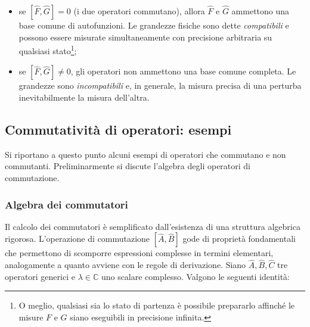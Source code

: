 \documentclass[a4paper,11pt]{report}
\begin{document}
\begin{itemize}
    \item se $[\hat{F}, \hat{G}] = 0$ (i due operatori commutano), allora $\hat{F}$ e $\hat{G}$ ammettono una base comune di autofunzioni. Le grandezze fisiche sono dette \textit{compatibili} e possono essere misurate simultaneamente con precisione arbitraria su qualsiasi stato\footnote{O meglio, qualsiasi sia lo stato di partenza è possibile prepararlo affinché le misure $F$ e $G$ siano eseguibili in precisione infinita.};
    \item se $[\hat{F}, \hat{G}] \neq 0$, gli operatori non ammettono una base comune completa. Le grandezze sono \textit{incompatibili} e, in generale, la misura precisa di una perturba inevitabilmente la misura dell'altra.
\end{itemize}

\subsection{Commutatività di operatori: esempi}
Si riportano a questo punto alcuni esempi di operatori che commutano e non commutanti. Preliminarmente si discute l'algebra degli operatori di commutazione.

\subsubsection{Algebra dei commutatori}
Il calcolo dei commutatori è semplificato dall'esistenza di una struttura algebrica rigorosa. L'operazione di commutazione $[\hat{A}, \hat{B}]$ gode di proprietà fondamentali che permettono di scomporre espressioni complesse in termini elementari, analogamente a quanto avviene con le regole di derivazione.
Siano $\hat{A}, \hat{B}, \hat{C}$ tre operatori generici e $\lambda \in \mathbb{C}$ uno scalare complesso. Valgono le seguenti identità:
\end{document}
